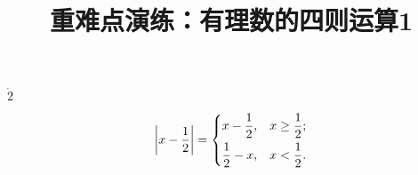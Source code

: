 \documentclass[fleqn]{ctexart}                                       %
\title{重难点演练：有理数的四则运算1}                                              %
\date{}                                                              %
\begin{document}
\hspace{4cm}{\Large 公式}                                 %

\noindent %

$\dot{2}

$

% 

\[\left\lvert x- \frac12 \right\rvert=\begin{dcases}
x-\frac12,& x\geq \frac12;\\
\frac12-x,& x<\frac12.
\end{dcases}\]
\end{document}
